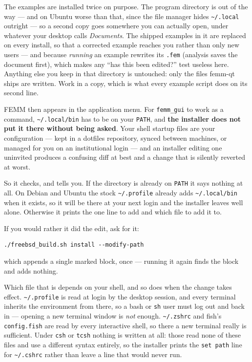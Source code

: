 \documentclass[11pt]{article}
\begin{document}
The examples are installed twice on purpose.  The program directory is out
of the way --- and on Ubuntu worse than that, since the file manager hides
\texttt{\textasciitilde/.local} outright --- so a second copy goes somewhere
you can actually open, under whatever your desktop calls \emph{Documents}.
The shipped examples in it are replaced on every install, so that a
corrected example reaches you rather than only new users --- and because
\emph{running} an example rewrites its \texttt{.fem} (analysis saves the
document first), which makes any ``has this been edited?'' test useless
here.  Anything else you keep in that directory is untouched: only the
files femm-qt ships are written.  Work in a copy, which is what every
example script does on its second line.

FEMM then appears in the application menu.  For \texttt{femm\_gui} to work
as a command, \texttt{\textasciitilde/.local/bin} has to be on your
\texttt{PATH}, and \textbf{the installer does not put it there without being
asked}.  Your shell startup files are your configuration --- kept in a
dotfiles repository, synced between machines, or managed for you on an
institutional login --- and an installer editing one uninvited produces a
confusing diff at best and a change that is silently reverted at worst.

So it checks, and tells you.  If the directory is already on \texttt{PATH}
it says nothing at all.  On Debian and Ubuntu the stock
\texttt{\textasciitilde/.profile} already adds
\texttt{\textasciitilde/.local/bin} when it exists, so it will be there at
your next login and the installer leaves well alone.  Otherwise it prints
the one line to add and which file to add it to.

If you would rather it did the edit, ask for it:
\begin{lstlisting}
./freebsd_build.sh install --modify-path
\end{lstlisting}
which appends a single marked block, once --- running it again finds the
block and adds nothing.

Which file that is depends on your shell, and so does when the change takes
effect.  \texttt{\textasciitilde/.profile} is read at login by the desktop
session, and every terminal inherits the environment from there, so a bash
or \texttt{sh} user must log out and back in --- opening a new terminal
window is \emph{not} enough.  \texttt{\textasciitilde/.zshrc} and fish's
\texttt{config.fish} are read by every interactive shell, so there a new
terminal really is sufficient.  Under \texttt{csh} or \texttt{tcsh} nothing
is written at all: those read none of these files and use a different syntax
entirely, so the installer prints the \texttt{set path} line for
\texttt{\textasciitilde/.cshrc} rather than leave a line that would never run.
\end{document}
